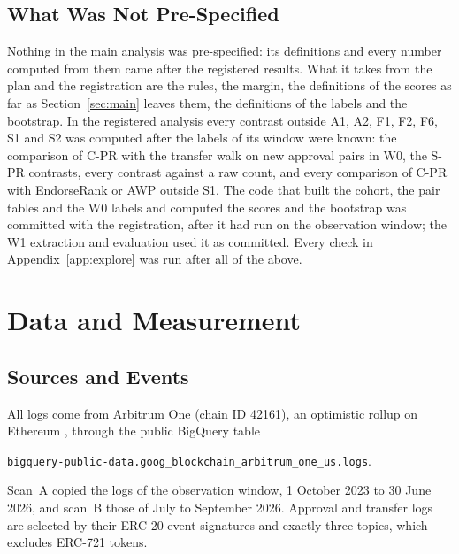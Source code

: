 \documentclass{ieeeaccess}
\newcommand{\cpr}{\mbox{C-PR}}
\newcommand{\spr}{\mbox{S-PR}}
\begin{document}
\subsection{What Was Not Pre-Specified}
Nothing in the main analysis was pre-specified: its definitions and every number computed from them came after the registered results. What it takes from the plan and the registration are the rules, the margin, the definitions of the scores as far as Section~\ref{sec:main} leaves them, the definitions of the labels and the bootstrap. In the registered analysis every contrast outside A1, A2, F1, F2, F6, S1 and S2 was computed after the labels of its window were known: the comparison of \cpr{} with the transfer walk on new approval pairs in W0, the \spr{} contrasts, every contrast against a raw count, and every comparison of \cpr{} with EndorseRank or AWP outside S1. The code that built the cohort, the pair tables and the W0 labels and computed the scores and the bootstrap was committed with the registration, after it had run on the observation window; the W1 extraction and evaluation used it as committed. Every check in Appendix~\ref{app:explore} was run after all of the above.

\section{Data and Measurement}
\label{sec:data}

\subsection{Sources and Events}
All logs come from Arbitrum One (chain ID 42161), an optimistic rollup on Ethereum \cite{kalodner2018arbitrum,thibault2022rollups}, through the public BigQuery table
\begin{center}
\texttt{\scriptsize bigquery-public-data.goog\_blockchain\_arbitrum\_one\_us.logs}.
\end{center}
Scan~A copied the logs of the observation window, 1 October 2023 to 30 June 2026, and scan~B those of July to September 2026. Approval and transfer logs are selected by their ERC-20 event signatures and exactly three topics, which excludes ERC-721 tokens.
\end{document}
